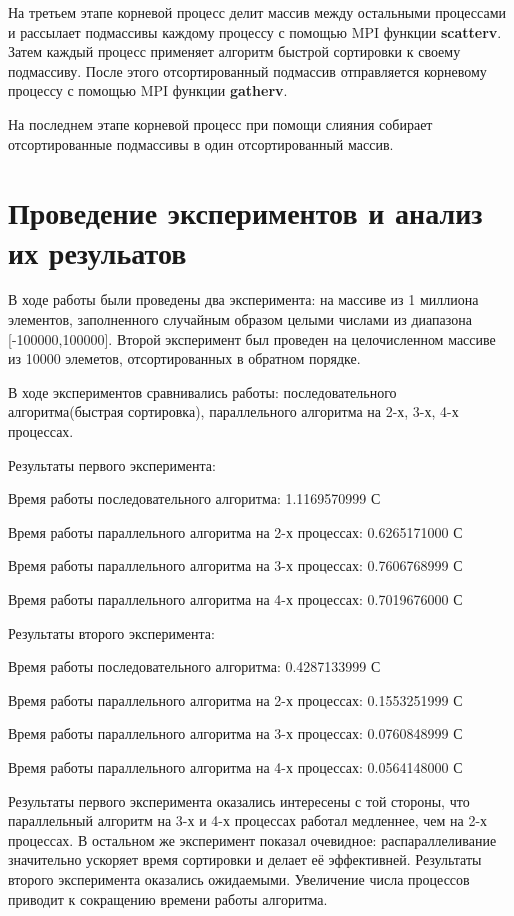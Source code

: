 \documentclass{report}
\begin{document}
На третьем этапе корневой процесс делит массив между остальными процессами и рассылает подмассивы каждому процессу с помощью MPI функции \textbf{scatterv}. Затем каждый процесс применяет алгоритм быстрой сортировки к своему подмассиву. После этого отсортированный подмассив отправляется корневому процессу с помощью MPI функции \textbf{gatherv}. 

На последнем этапе корневой процесс при помощи слияния собирает отсортированные подмассивы в один отсортированный массив.

\section*{Проведение экспериментов и анализ их резульатов}  

В ходе работы были проведены два эксперимента: на массиве из 1 миллиона элементов, заполненного случайным образом целыми числами из диапазона [-100000,100000]. Второй эксперимент был проведен на целочисленном массиве из 10000 элеметов, отсортированных в обратном порядке.

В ходе экспериментов сравнивались работы: последовательного алгоритма(быстрая сортировка), параллельного алгоритма на 2-х, 3-х, 4-х процессах.

Результаты первого эксперимента:

Время работы последовательного алгоритма: 1.1169570999 С

Время работы параллельного алгоритма на 2-х процессах: 0.6265171000 С

Время работы параллельного алгоритма на 3-х процессах: 0.7606768999 С

Время работы параллельного алгоритма на 4-х процессах: 0.7019676000 С

Результаты второго эксперимента:

Время работы последовательного алгоритма: 0.4287133999 С

Время работы параллельного алгоритма на 2-х процессах: 0.1553251999 С

Время работы параллельного алгоритма на 3-х процессах: 0.0760848999 С

Время работы параллельного алгоритма на 4-х процессах: 0.0564148000 С

Результаты первого эксперимента оказались интересены с той стороны, что параллельный алгоритм на 3-х и 4-х процессах работал медленнее, чем на 2-х процессах. В остальном же эксперимент показал очевидное: распараллеливание значительно ускоряет время сортировки и делает её эффективней. Результаты второго эксперимента оказались ожидаемыми. Увеличение числа процессов приводит к сокращению времени работы алгоритма.
\end{document}
